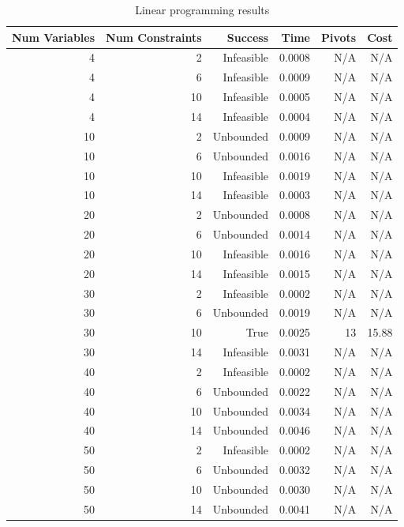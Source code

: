 \begin{table}[ht]
    \centering
    \begin{tabular}{rrrrrr}
        \toprule
        Num Variables & Num Constraints & Success & Time & Pivots & Cost \\
        \midrule
        4 & 2 & Infeasible & 0.0008 & N/A & N/A \\
		4 & 6 & Infeasible & 0.0009 & N/A & N/A \\
		4 & 10 & Infeasible & 0.0005 & N/A & N/A \\
		4 & 14 & Infeasible & 0.0004 & N/A & N/A \\
		10 & 2 & Unbounded & 0.0009 & N/A & N/A \\
		10 & 6 & Unbounded & 0.0016 & N/A & N/A \\
		10 & 10 & Infeasible & 0.0019 & N/A & N/A \\
		10 & 14 & Infeasible & 0.0003 & N/A & N/A \\
		20 & 2 & Unbounded & 0.0008 & N/A & N/A \\
		20 & 6 & Unbounded & 0.0014 & N/A & N/A \\
		20 & 10 & Infeasible & 0.0016 & N/A & N/A \\
		20 & 14 & Infeasible & 0.0015 & N/A & N/A \\
		30 & 2 & Infeasible & 0.0002 & N/A & N/A \\
		30 & 6 & Unbounded & 0.0019 & N/A & N/A \\
		30 & 10 & True & 0.0025 & 13 & 15.88 \\
		30 & 14 & Infeasible & 0.0031 & N/A & N/A \\
		40 & 2 & Infeasible & 0.0002 & N/A & N/A \\
		40 & 6 & Unbounded & 0.0022 & N/A & N/A \\
		40 & 10 & Unbounded & 0.0034 & N/A & N/A \\
		40 & 14 & Unbounded & 0.0046 & N/A & N/A \\
		50 & 2 & Infeasible & 0.0002 & N/A & N/A \\
		50 & 6 & Unbounded & 0.0032 & N/A & N/A \\
		50 & 10 & Unbounded & 0.0030 & N/A & N/A \\
		50 & 14 & Unbounded & 0.0041 & N/A & N/A \\
        \bottomrule
    \end{tabular}
    \caption{Linear programming results}
    \label{tab:lp-results}
\end{table}